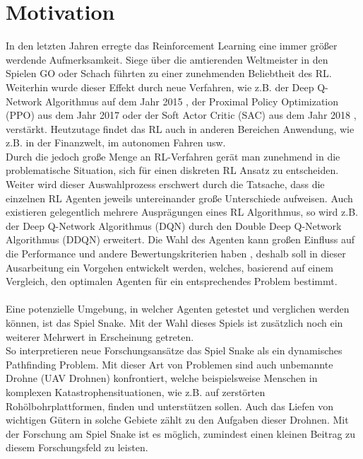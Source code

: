 \section{Motivation} \label{sec:Einleitung_Motivation}
In den letzten Jahren erregte das Reinforcement Learning eine immer größer werdende Aufmerksamkeit. Siege über die amtierenden Weltmeister in den Spielen GO oder Schach führten zu einer zunehmenden Beliebtheit des RL. Weiterhin wurde dieser Effekt durch neue Verfahren, wie z.B. der Deep Q-Network Algorithmus auf dem Jahr 2015 \citep{DQN}, der Proximal Policy Optimization (PPO) aus dem Jahr 2017 \citep{PPO} oder der Soft Actor Critic (SAC) aus dem Jahr 2018 \citep{SAC}, verstärkt. Heutzutage findet das RL auch in anderen Bereichen Anwendung, wie z.B. in der Finanzwelt, im autonomen Fahren usw.\\
Durch die jedoch große Menge an RL-Verfahren gerät man zunehmend in die problematische Situation, sich für einen diskreten RL Ansatz zu entscheiden. Weiter wird dieser Auswahlprozess erschwert durch die Tatsache, dass die einzelnen RL Agenten jeweils untereinander große Unterschiede aufweisen. Auch existieren gelegentlich mehrere Ausprägungen eines RL Algorithmus, so wird z.B. der Deep Q-Network Algorithmus (DQN) durch den Double Deep Q-Network Algorithmus (DDQN) erweitert. Die Wahl des Agenten kann großen Einfluss auf die Performance und andere Bewertungskriterien haben \citep{Exploration_of_Reinforcement_Learning_to_SNAKE}, deshalb soll in dieser Ausarbeitung ein Vorgehen entwickelt werden, welches, basierend auf einem Vergleich, den optimalen Agenten für ein entsprechendes Problem bestimmt.\\
\\Eine potenzielle Umgebung, in welcher Agenten getestet und verglichen werden können, ist das Spiel Snake.
Mit der Wahl dieses Spiels ist zusätzlich noch ein weiterer Mehrwert in Erscheinung getreten.\\ 
So interpretieren neue Forschungsansätze das Spiel Snake als ein dynamisches Pathfinding Problem. Mit dieser Art von Problemen sind auch unbemannte Drohne (UAV Drohnen) konfrontiert, welche beispielsweise Menschen in komplexen Katastrophensituationen, wie z.B. auf zerstörten Rohölbohrplattformen, finden und unterstützen sollen. 
Auch das Liefen von wichtigen Gütern in solche Gebiete zählt zu den Aufgaben dieser Drohnen.
Mit der Forschung am Spiel Snake ist es möglich, zumindest einen kleinen Beitrag zu diesem Forschungsfeld zu leisten. \citep{UAV}


